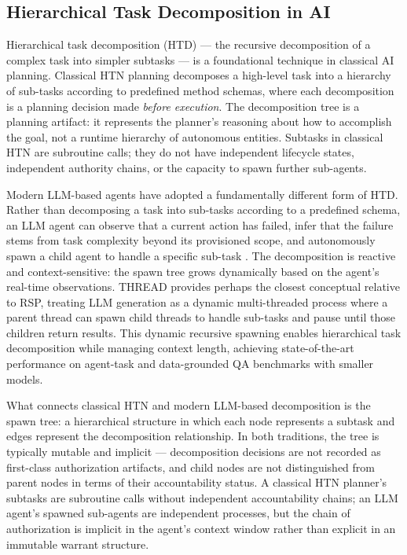 \subsection{Hierarchical Task Decomposition in AI}

Hierarchical task decomposition (HTD) --- the recursive decomposition of a complex task into simpler subtasks --- is a foundational technique in classical AI planning. Classical HTN planning \cite{ghallab2004htn,erpl} decomposes a high-level task into a hierarchy of sub-tasks according to predefined method schemas, where each decomposition is a planning decision made \emph{before execution}. The decomposition tree is a planning artifact: it represents the planner's reasoning about how to accomplish the goal, not a runtime hierarchy of autonomous entities. Subtasks in classical HTN are subroutine calls; they do not have independent lifecycle states, independent authority chains, or the capacity to spawn further sub-agents.

Modern LLM-based agents have adopted a fundamentally different form of HTD. Rather than decomposing a task into sub-tasks according to a predefined schema, an LLM agent can observe that a current action has failed, infer that the failure stems from task complexity beyond its provisioned scope, and autonomously spawn a child agent to handle a specific sub-task \cite{press2022,yao2022,thread2025}. The decomposition is reactive and context-sensitive: the spawn tree grows dynamically based on the agent's real-time observations. THREAD \cite{thread2025} provides perhaps the closest conceptual relative to RSP, treating LLM generation as a dynamic multi-threaded process where a parent thread can spawn child threads to handle sub-tasks and pause until those children return results. This dynamic recursive spawning enables hierarchical task decomposition while managing context length, achieving state-of-the-art performance on agent-task and data-grounded QA benchmarks with smaller models.

What connects classical HTN and modern LLM-based decomposition is the spawn tree: a hierarchical structure in which each node represents a subtask and edges represent the decomposition relationship. In both traditions, the tree is typically mutable and implicit --- decomposition decisions are not recorded as first-class authorization artifacts, and child nodes are not distinguished from parent nodes in terms of their accountability status. A classical HTN planner's subtasks are subroutine calls without independent accountability chains; an LLM agent's spawned sub-agents are independent processes, but the chain of authorization is implicit in the agent's context window rather than explicit in an immutable warrant structure.

